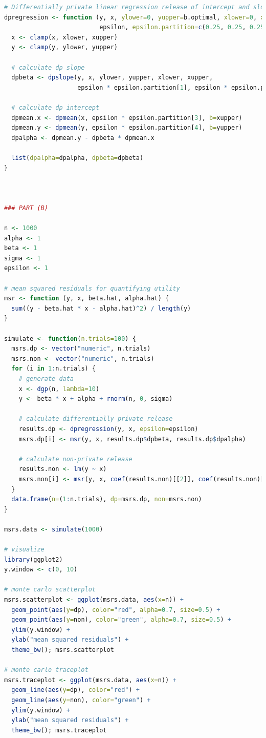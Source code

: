 \documentclass[12pt]{article}
\begin{document}
\begin{lstlisting}[language=R]
# Differentially private linear regression release of intercept and slope
dpregression <- function (y, x, ylower=0, yupper=b.optimal, xlower=0, xupper=b.optimal,
                          epsilon, epsilon.partition=c(0.25, 0.25, 0.25, 0.25)) {
  x <- clamp(x, xlower, xupper)
  y <- clamp(y, ylower, yupper)
  
  # calculate dp slope
  dpbeta <- dpslope(y, x, ylower, yupper, xlower, xupper,
                    epsilon * epsilon.partition[1], epsilon * epsilon.partition[2])
  
  # calculate dp intercept
  dpmean.x <- dpmean(x, epsilon * epsilon.partition[3], b=xupper)
  dpmean.y <- dpmean(y, epsilon * epsilon.partition[4], b=yupper)
  dpalpha <- dpmean.y - dpbeta * dpmean.x
  
  list(dpalpha=dpalpha, dpbeta=dpbeta)
}



### PART (B)

n <- 1000
alpha <- 1
beta <- 1
sigma <- 1
epsilon <- 1

# mean squared residuals for quantifying utility
msr <- function (y, x, beta.hat, alpha.hat) {
  sum((y - beta.hat * x - alpha.hat)^2) / length(y)
}

simulate <- function(n.trials=100) {
  msrs.dp <- vector("numeric", n.trials)
  msrs.non <- vector("numeric", n.trials)
  for (i in 1:n.trials) {
    # generate data
    x <- dgp(n, lambda=10)
    y <- beta * x + alpha + rnorm(n, 0, sigma)
    
    # calculate differentially private release
    results.dp <- dpregression(y, x, epsilon=epsilon)
    msrs.dp[i] <- msr(y, x, results.dp$dpbeta, results.dp$dpalpha)
    
    # calculate non-private release
    results.non <- lm(y ~ x)
    msrs.non[i] <- msr(y, x, coef(results.non)[[2]], coef(results.non)[[1]])
  }
  data.frame(n=(1:n.trials), dp=msrs.dp, non=msrs.non)
}

msrs.data <- simulate(1000)

# visualize
library(ggplot2)
y.window <- c(0, 10)

# monte carlo scatterplot
msrs.scatterplot <- ggplot(msrs.data, aes(x=n)) +
  geom_point(aes(y=dp), color="red", alpha=0.7, size=0.5) +
  geom_point(aes(y=non), color="green", alpha=0.7, size=0.5) +
  ylim(y.window) +
  ylab("mean squared residuals") +
  theme_bw(); msrs.scatterplot

# monte carlo traceplot
msrs.traceplot <- ggplot(msrs.data, aes(x=n)) +
  geom_line(aes(y=dp), color="red") +
  geom_line(aes(y=non), color="green") +
  ylim(y.window) +
  ylab("mean squared residuals") +
  theme_bw(); msrs.traceplot


\end{lstlisting}
\end{document}
